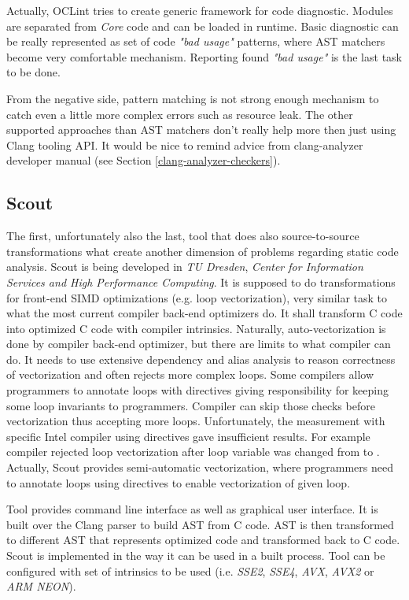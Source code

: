 Actually, OCLint tries to create generic framework for code diagnostic. Modules are separated from \emph{Core} code and can be loaded in runtime. Basic diagnostic can be really represented as set of code \textit{"bad usage"} patterns, where AST matchers become very comfortable mechanism. Reporting found \textit{"bad usage"} is the last task to be done.

From the negative side, pattern matching is not strong enough mechanism to catch even a little more complex errors such as resource leak. The other supported approaches than AST matchers don't really help more then just using Clang tooling API. It would be nice to remind advice from clang-analyzer developer manual (see Section \ref{clang-analyzer-checkers}).

\subsection{Scout}
\label{scout}
The first, unfortunately also the last, tool that does also source-to-source transformations what create another dimension of problems regarding static code analysis. Scout is being developed in \emph{TU Dresden}, \emph{Center for Information Services and High Performance Computing}. It is supposed to do transformations for front-end SIMD optimizations (e.g. loop vectorization), very similar task to what the most current compiler back-end optimizers do. It shall transform C code into optimized C code with compiler intrinsics. Naturally, auto-vectorization is done by compiler back-end optimizer, but there are limits to what compiler can do. It needs to use extensive dependency and alias analysis to reason correctness of vectorization and often rejects more complex loops. Some compilers allow programmers to annotate loops with  directives giving responsibility for keeping some loop invariants to programmers. Compiler can skip those checks before vectorization thus accepting more loops. Unfortunately, the measurement with specific Intel compiler using  directives gave insufficient results. For example compiler rejected loop vectorization after loop variable was changed from  to . Actually, Scout provides semi-automatic vectorization, where programmers need to annotate loops using  directives to enable vectorization of given loop. 

Tool provides command line interface as well as graphical user interface. It is built over the Clang parser to build AST from C code. AST is then transformed to different AST that represents optimized code and transformed back to C code. Scout is implemented in the way it can be used in a built process. Tool can be configured with set of intrinsics to be used (i.e. \emph{SSE2}, \emph{SSE4}, \emph{AVX}, \emph{AVX2} or \emph{ARM NEON}).

